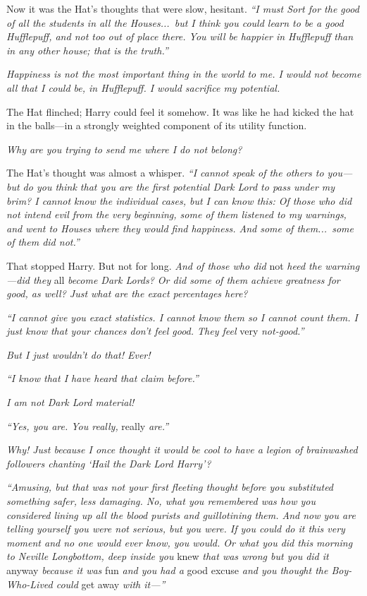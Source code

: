 Now it was the Hat’s thoughts that were slow, hesitant. \emph{“I must Sort for the good of all the students in all the Houses...\ but I think you could learn to be a good Hufflepuff, and not too out of place there. You will be happier in Hufflepuff than in any other house; that is the truth.”}

\emph{Happiness is not the most important thing in the world to me. I would not become all that I could be, in Hufflepuff. I would sacrifice my potential.}

The Hat flinched; Harry could feel it somehow. It was like he had kicked the hat in the balls—in a strongly weighted component of its utility function.

\emph{Why are you trying to send me where I do not belong?}

The Hat’s thought was almost a whisper. \emph{“I cannot speak of the others to you—but do you think that you are the first potential Dark Lord to pass under my brim? I cannot know the individual cases, but I can know this: Of those who did not intend evil from the very beginning, some of them listened to my warnings, and went to Houses where they would find happiness. And some of them...\ some of them did not.”}

That stopped Harry. But not for long. \emph{And of those who did} not \emph{heed the warning—did they} all \emph{become Dark Lords? Or did some of them achieve greatness for good, as well? Just what are the exact percentages here?}

\emph{“I cannot give you exact statistics. I cannot know them so I cannot count them. I just know that your chances don’t feel good. They feel} very \emph{not-good.”}

\emph{But I just wouldn’t do that! Ever!}

\emph{“I know that I have heard that claim before.”}

\emph{I am not Dark Lord material!}

\emph{“Yes, you are. You really,} really \emph{are.”}

\emph{Why! Just because I once thought it would be cool to have a legion of brainwashed followers chanting ‘Hail the Dark Lord Harry’?}

\emph{“Amusing, but that was not your first fleeting thought before you substituted something safer, less damaging. No, what you remembered was how you considered lining up all the blood purists and guillotining them. And now you are telling yourself you were not serious, but you were. If you could do it this very moment and no one would ever know, you would. Or what you did this morning to Neville Longbottom, deep inside you} knew \emph{that was wrong but you did it} anyway \emph{because it was} fun \emph{and you had a} good excuse \emph{and you thought the Boy-Who-Lived could} get away \emph{with it—”}

